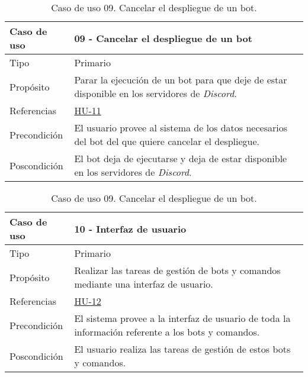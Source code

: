 \begin{table}[H]
    \centering
    \def\arraystretch{1.25}
    \begin{adjustbox}{max width=\textwidth}
    \begin{tabularx}{\textwidth}{|l|L|}
    \hline
        \textbf{Caso de uso} & \textbf{09 - Cancelar el despliegue de un bot} \\ \hline
    \hline
        Tipo & Primario \\ \hline
        Propósito & Parar la ejecución de un bot para que deje de estar disponible en los servidores de \textit{Discord}. \\ \hline
        Referencias & \hyperref[sec:hu11]{HU-11} \\ \hline
        Precondición & El usuario provee al sistema de los datos necesarios del bot del que quiere cancelar el despliegue. \\ \hline
        Poscondición & El bot deja de ejecutarse y deja de estar disponible en los servidores de \textit{Discord}. \\ \hline
    \end{tabularx}
    \end{adjustbox}
    \caption{Caso de uso 09. Cancelar el despliegue de un bot.}
\end{table}

\begin{table}[H]
    \centering
    \def\arraystretch{1.25}
    \begin{adjustbox}{max width=\textwidth}
    \begin{tabularx}{\textwidth}{|l|L|}
    \hline
        \textbf{Caso de uso} & \textbf{10 - Interfaz de usuario} \\ \hline
    \hline
        Tipo & Primario \\ \hline
        Propósito & Realizar las tareas de gestión de bots y comandos mediante una interfaz de usuario. \\ \hline
        Referencias & \hyperref[sec:hu12]{HU-12} \\ \hline
        Precondición & El sistema provee a la interfaz de usuario de toda la información referente a los bots y comandos. \\ \hline
        Poscondición & El usuario realiza las tareas de gestión de estos bots y comandos. \\ \hline
    \end{tabularx}
    \end{adjustbox}
    \caption{Caso de uso 09. Cancelar el despliegue de un bot.}
\end{table}

